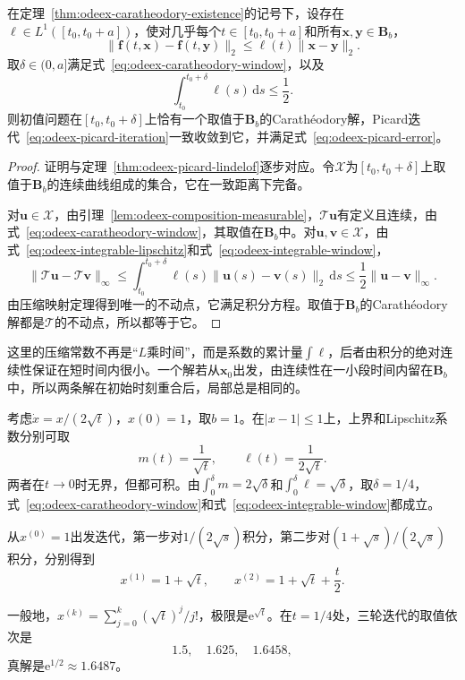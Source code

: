 \begin{theorem}[可积Lipschitz系数下的唯一性]
\label{thm:odeex-caratheodory-unique}
在定理~\ref{thm:odeex-caratheodory-existence}的记号下，设存在$\ell\in L^1([t_0,t_0+a])$，使对几乎每个$t\in[t_0,t_0+a]$和所有$\bm{x},\bm{y}\in\bm{B}_b$，
\begin{equation}
 \lVert\bm{f}(t,\bm{x})-\bm{f}(t,\bm{y})\rVert_2\leq\ell(t)\lVert\bm{x}-\bm{y}\rVert_2.
 \label{eq:odeex-integrable-lipschitz}
\end{equation}
取$\delta\in(0,a]$满足式~\eqref{eq:odeex-caratheodory-window}，以及
\begin{equation}
 \int_{t_0}^{t_0+\delta}\ell(s)\,\mathrm{d}s\leq\frac12.
 \label{eq:odeex-integrable-window}
\end{equation}
则初值问题在$[t_0,t_0+\delta]$上恰有一个取值于$\bm{B}_b$的Carathéodory解，Picard迭代~\eqref{eq:odeex-picard-iteration}一致收敛到它，并满足式~\eqref{eq:odeex-picard-error}。
\end{theorem}

\begin{proof}
证明与定理~\ref{thm:odeex-picard-lindelof}逐步对应。令$\mathcal{X}$为$[t_0,t_0+\delta]$上取值于$\bm{B}_b$的连续曲线组成的集合，它在一致距离下完备。

对$\bm{u}\in\mathcal{X}$，由引理~\ref{lem:odeex-composition-measurable}，$\mathcal{T}\bm{u}$有定义且连续，由式~\eqref{eq:odeex-caratheodory-window}，其取值在$\bm{B}_b$中。对$\bm{u},\bm{v}\in\mathcal{X}$，由式~\eqref{eq:odeex-integrable-lipschitz}和式~\eqref{eq:odeex-integrable-window}，
\[
 \lVert\mathcal{T}\bm{u}-\mathcal{T}\bm{v}\rVert_{\infty}
 \leq\int_{t_0}^{t_0+\delta}\ell(s)\lVert\bm{u}(s)-\bm{v}(s)\rVert_2\,\mathrm{d}s
 \leq\frac12\lVert\bm{u}-\bm{v}\rVert_{\infty}.
\]
由压缩映射定理得到唯一的不动点，它满足积分方程。取值于$\bm{B}_b$的Carathéodory解都是$\mathcal{T}$的不动点，所以都等于它。
\end{proof}

这里的压缩常数不再是“$L$乘时间”，而是系数的累计量$\int\ell$，后者由积分的绝对连续性保证在短时间内很小。一个解若从$\bm{x}_0$出发，由连续性在一小段时间内留在$\bm{B}_b$中，所以两条解在初始时刻重合后，局部总是相同的。

\begin{example}[系数无界的唯一性]
\label{ex:odeex-integrable-lipschitz}
考虑$\dot x=x/(2\sqrt{t})$，$x(0)=1$，取$b=1$。在$\lvert x-1\rvert\leq1$上，上界和Lipschitz系数分别可取
\[
 m(t)=\frac{1}{\sqrt{t}},\qquad\ell(t)=\frac{1}{2\sqrt{t}}.
\]
两者在$t\to0$时无界，但都可积。由$\int_0^\delta m=2\sqrt{\delta}$和$\int_0^\delta\ell=\sqrt{\delta}$，取$\delta=1/4$，式~\eqref{eq:odeex-caratheodory-window}和式~\eqref{eq:odeex-integrable-window}都成立。

从$x^{(0)}=1$出发迭代，第一步对$1/(2\sqrt{s})$积分，第二步对$(1+\sqrt{s})/(2\sqrt{s})$积分，分别得到
\[
 x^{(1)}=1+\sqrt{t},\qquad x^{(2)}=1+\sqrt{t}+\frac{t}{2}.
\]

一般地，$x^{(k)}=\sum_{j=0}^{k}(\sqrt{t})^j/j!$，极限是$\mathrm{e}^{\sqrt{t}}$。在$t=1/4$处，三轮迭代的取值依次是
\[
 1.5,\quad1.625,\quad1.6458,
\]
真解是$\mathrm{e}^{1/2}\approx1.6487$。
\end{example}

